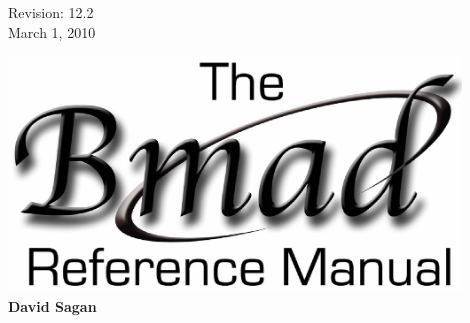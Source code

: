 \thispagestyle{empty}

\begin{flushright}
\large
  Revision: 12.2 \\
  March 1, 2010 \\
\end{flushright}

\vfill

{
\begin{center}
\includegraphics[width=12cm]{bmad-ref-manual.eps} \\
\vskip 0.3in
\huge\bf David Sagan
\end{center}
}

\vfill
\break

